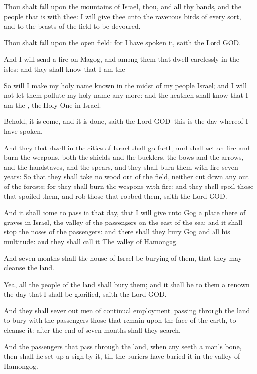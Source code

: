 \verse Thou shalt fall upon the mountains of Israel, thou, and all thy bands, and the people that is with thee: I will give thee unto the ravenous birds of every sort, and to the beasts of the field to be devoured.

\verse Thou shalt fall upon the open field: for I have spoken it, saith the Lord GOD.

\verse And I will send a fire on Magog, and among them that dwell carelessly in the isles: and they shall know that I am the \LORD.

\verse So will I make my holy name known in the midst of my people Israel; and I will not let them pollute my holy name any more: and the heathen shall know that I am the \LORD, the Holy One in Israel.

\verse Behold, it is come, and it is done, saith the Lord GOD; this is the day whereof I have spoken.

\verse And they that dwell in the cities of Israel shall go forth, and shall set on fire and burn the weapons, both the shields and the bucklers, the bows and the arrows, and the handstaves, and the spears, and they shall burn them with fire seven years: \verse So that they shall take no wood out of the field, neither cut down any out of the forests; for they shall burn the weapons with fire: and they shall spoil those that spoiled them, and rob those that robbed them, saith the Lord GOD.

\verse And it shall come to pass in that day, that I will give unto Gog a place there of graves in Israel, the valley of the passengers on the east of the sea: and it shall stop the noses of the passengers: and there shall they bury Gog and all his multitude: and they shall call it The valley of Hamongog.

\verse And seven months shall the house of Israel be burying of them, that they may cleanse the land.

\verse Yea, all the people of the land shall bury them; and it shall be to them a renown the day that I shall be glorified, saith the Lord GOD.

\verse And they shall sever out men of continual employment, passing through the land to bury with the passengers those that remain upon the face of the earth, to cleanse it: after the end of seven months shall they search.

\verse And the passengers that pass through the land, when any seeth a man's bone, then shall he set up a sign by it, till the buriers have buried it in the valley of Hamongog.

